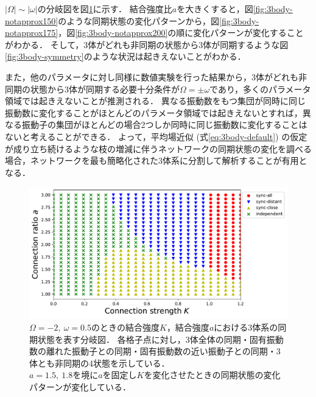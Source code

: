 \documentclass[../main]{subfiles}
\begin{document}
$|\Omega|\sim|\omega|$の分岐図を図\ref{fig:3body-phase-boundary}に示す．
結合強度比$a$を大きくすると，図\ref{fig:3body-notapprox150}のような同期状態の変化パターンから，図\ref{fig:3body-notapprox175}，図\ref{fig:3body-notapprox200}の順に変化パターンが変化することがわかる．
そして，3体がどれも非同期の状態から3体が同期するような図\ref{fig:3body-symmetry}のような状況は起きえないことがわかる．

また，他のパラメータに対し同様に数値実験を行った結果から，3体がどれも非同期の状態から3体が同期する必要十分条件が$\Omega=\pm\omega$であり，多くのパラメータ領域では起きえないことが推測される．
異なる振動数をもつ集団が同時に同じ振動数に変化することがほとんどのパラメータ領域では起きえないとすれば，異なる振動子の集団がほとんどの場合2つしか同時に同じ振動数に変化することはないと考えることができる．
よって，平均場近似 (式\eqref{eq:3body-default}) の仮定が成り立ち続けるような枝の増減に伴うネットワークの同期状態の変化を調べる場合，ネットワークを最も簡略化された3体系に分割して解析することが有用となる．

\begin{figure}[tbp]
\centering
\includegraphics[width=135mm]{./images/three-body-phase-boundary.pdf}
\centering
\caption{$\Omega=-2,\ \omega=0.5$のときの結合強度$K$，結合強度$a$における3体系の同期状態を表す分岐図．
各格子点に対し，3体全体の同期・固有振動数の離れた振動子との同期・固有振動数の近い振動子との同期・3体とも非同期の4状態を示している．\\
$a=1.5,\ 1.8$を境に$a$を固定し$K$を変化させたときの同期状態の変化パターンが変化している．}
\label{fig:3body-phase-boundary}
\end{figure}
\end{document}
